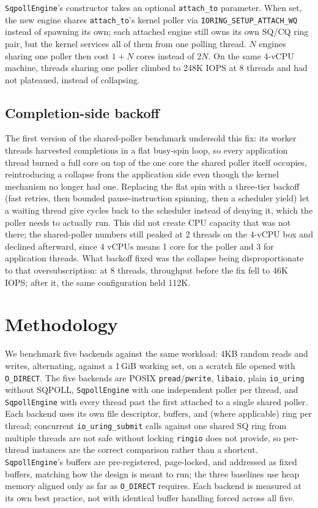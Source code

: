 \documentclass[conference]{IEEEtran}
\begin{document}
\texttt{SqpollEngine}'s constructor takes an optional \texttt{attach\_to} parameter. When set,
the new engine shares \texttt{attach\_to}'s kernel poller via \texttt{IORING\_SETUP\_ATTACH\_WQ}
instead of spawning its own; each attached engine still owns its own SQ/CQ ring pair, but the
kernel services all of them from one polling thread. $N$ engines sharing one poller then cost
$1 + N$ cores instead of $2N$. On the same 4-vCPU machine, threads sharing one poller climbed to
248K IOPS at 8 threads and had not plateaued, instead of collapsing.

\subsection{Completion-side backoff}

The first version of the shared-poller benchmark undersold this fix: its worker threads
harvested completions in a flat busy-spin loop, so every application thread burned a full core on
top of the one core the shared poller itself occupies, reintroducing a collapse from the
application side even though the kernel mechanism no longer had one. Replacing the flat spin with
a three-tier backoff (fast retries, then bounded pause-instruction spinning, then a scheduler
yield) let a waiting thread give cycles back to the scheduler instead of denying it, which the
poller needs to actually run. This did not create CPU capacity that was not there; the
shared-poller numbers still peaked at 2 threads on the 4-vCPU box and declined afterward, since 4
vCPUs means 1 core for the poller and 3 for application threads. What backoff fixed was the
collapse being disproportionate to that oversubscription: at 8 threads, throughput before the fix
fell to 46K IOPS; after it, the same configuration held 112K.

\section{Methodology}

We benchmark five backends against the same workload: 4KB random reads and writes, alternating,
against a 1\,GiB working set, on a scratch file opened with \texttt{O\_DIRECT}. The five
backends are POSIX \texttt{pread}/\texttt{pwrite}, \texttt{libaio}, plain \texttt{io\_uring}
without SQPOLL, \texttt{SqpollEngine} with one independent poller per thread, and
\texttt{SqpollEngine} with every thread past the first attached to a single shared poller. Each
backend uses its own file descriptor, buffers, and (where applicable) ring per thread; concurrent
\texttt{io\_uring\_submit} calls against one shared SQ ring from multiple threads are not safe
without locking \texttt{ringio} does not provide, so per-thread instances are the correct
comparison rather than a shortcut. \texttt{SqpollEngine}'s buffers are pre-registered,
page-locked, and addressed as fixed buffers, matching how the design is meant to run; the three
baselines use heap memory aligned only as far as \texttt{O\_DIRECT} requires. Each backend is
measured at its own best practice, not with identical buffer handling forced across all five.
\end{document}
